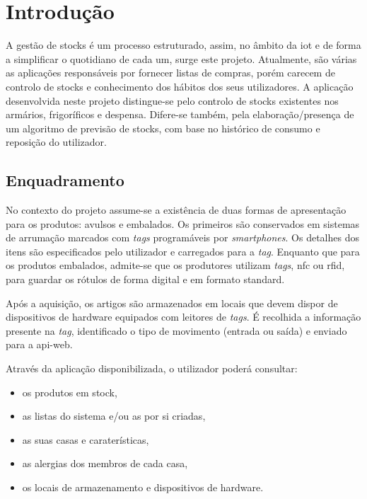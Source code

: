 %
%
\chapter{Introdução} \label{cap1}

A gestão de stocks é um processo estruturado, assim, no âmbito da \acrfull{iot} e de forma a simplificar o quotidiano de cada um, surge este projeto. Atualmente, são várias as aplicações responsáveis por fornecer listas de compras, porém carecem de controlo de stocks e conhecimento dos hábitos dos seus utilizadores. A aplicação desenvolvida neste projeto distingue-se pelo controlo de stocks existentes nos armários, frigoríficos e despensa. Difere-se também, pela elaboração/presença de um algoritmo de previsão de stocks, com base no histórico de consumo e reposição do utilizador.

%
%
\section{Enquadramento} \label{sec11}

No contexto do projeto assume-se a existência de duas formas de apresentação para os produtos: avulsos e embalados. Os primeiros são conservados em sistemas de arrumação marcados com \textit{tags} programáveis por \textit{smartphones}. Os detalhes dos itens são especificados pelo utilizador e carregados para a \textit{tag}. Enquanto que para os produtos embalados, admite-se que os produtores utilizam \textit{tags}, \acrfull{nfc} ou \acrfull{rfid}, para guardar os rótulos de forma digital e em formato standard.

Após a aquisição, os artigos são armazenados em locais que devem dispor de dispositivos de hardware equipados com leitores de \textit{tags}. É recolhida a informação presente na \textit{tag}, identificado o tipo de movimento (entrada ou saída) e enviado para a \gls{api-web}. 

Através da aplicação disponibilizada, o utilizador poderá consultar:
\begin{itemize} \itemsep 0pt
	\item os produtos em stock,
	\item as listas do sistema e/ou as por si criadas,
	\item as suas casas e caraterísticas,
	\item as alergias dos membros de cada casa,
	\item os locais de armazenamento e dispositivos de hardware.
\end{itemize}

